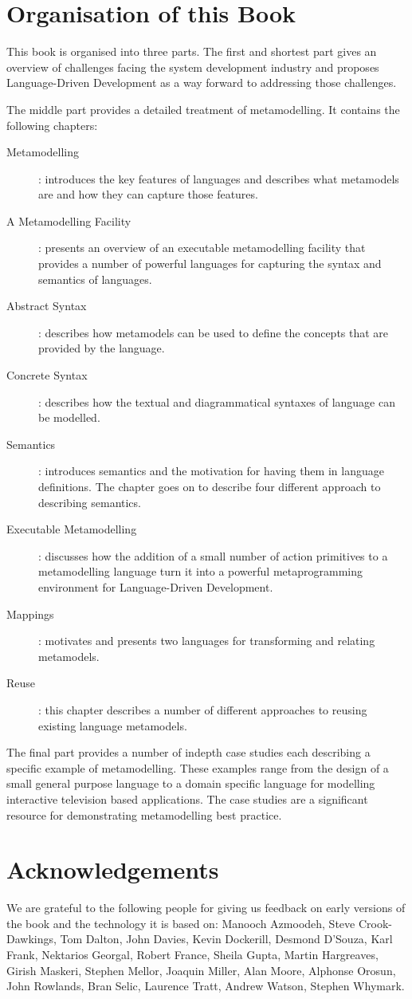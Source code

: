 \section*{Organisation of this Book}

This book is organised into three parts. The first and shortest
part gives an overview of challenges facing the system development
industry and proposes Language-Driven Development as a way forward
to addressing those challenges.

The middle part provides a detailed treatment of metamodelling. It
contains the following chapters:

\begin{description}
\item[Metamodelling]: introduces the key features of languages and
describes what metamodels are and how they can capture those
features. \item[A Metamodelling Facility]: presents an overview of
an executable metamodelling facility that provides a number of
powerful languages for capturing the syntax and semantics of
languages. \item[Abstract Syntax]: describes how metamodels can be
used to define the concepts that are provided by the language.
\item[Concrete Syntax]: describes how the textual and
diagrammatical syntaxes of language can be modelled. \item [
Semantics]: introduces semantics and the motivation for having
them in language definitions. The chapter goes on to describe four
different approach to describing semantics. \item[Executable
Metamodelling]: discusses how the addition of a small number of
action primitives to a metamodelling language turn it into a
powerful metaprogramming environment for Language-Driven
Development. \item[Mappings]: motivates and presents two languages
for transforming and relating metamodels. \item[Reuse]: this
chapter describes a number of different approaches to reusing
existing language metamodels.
\end{description}

The final part provides a number of indepth case studies each describing a
specific example of metamodelling.  These examples range from the design of
a small general purpose language to a domain specific language for modelling
interactive television based applications.  The case studies are a significant
resource for demonstrating metamodelling best practice.

\section*{Acknowledgements}

We are grateful to the following people for giving us feedback on
early versions of the book and the technology it is based on:
Manooch Azmoodeh, Steve Crook-Dawkings, Tom Dalton, John Davies,
Kevin Dockerill, Desmond D'Souza, Karl Frank, Nektarios Georgal,
Robert France, Sheila Gupta, Martin Hargreaves, Girish Maskeri,
Stephen Mellor, Joaquin Miller, Alan Moore, Alphonse Orosun, John
Rowlands, Bran Selic, Laurence Tratt, Andrew Watson, Stephen
Whymark.
